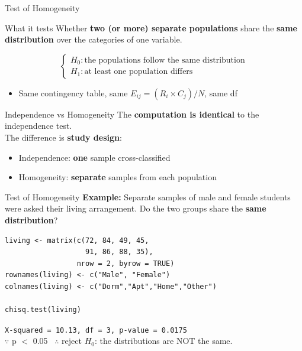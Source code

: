 \documentclass{beamer}					%
\begin{document}
\begin{frame}{Test of Homogeneity}
\small
\begin{block}{What it tests}
Whether \textbf{two (or more) separate populations} share the
\textbf{same distribution} over the categories of one variable.
\end{block}

\vspace{0.5em}
$$
\begin{cases}
H_0: \text{the populations follow the same distribution} \\
H_1: \text{at least one population differs}
\end{cases}
$$

\begin{itemize}
    \item Same contingency table, same $E_{ij} = (R_i \times C_j)/N$, same df
\end{itemize}

\vspace{0.8em}
\begin{alertblock}{Independence vs Homogeneity}
The \textbf{computation is identical} to the independence test.\\
The difference is \textbf{study design}: 
\begin{itemize}
    \item Independence: \textbf{one} sample cross-classified
    \item Homogeneity: \textbf{separate} samples from each population
\end{itemize}
\end{alertblock}

\end{frame}


\begin{frame}[fragile]{Test of Homogeneity}
\small
\textbf{Example:} Separate samples of male and female students were asked
their living arrangement. Do the two groups share the \textbf{same distribution}?

\begin{lstlisting}
living <- matrix(c(72, 84, 49, 45,
                   91, 86, 88, 35),
                 nrow = 2, byrow = TRUE)
rownames(living) <- c("Male", "Female")
colnames(living) <- c("Dorm","Apt","Home","Other")

chisq.test(living)
\end{lstlisting}

\vspace{0.3em}
\texttt{X-squared = 10.13, df = 3, p-value = 0.0175}\\

\vspace{0.3em}
$\because$ p $<$ 0.05 \ $\therefore$ reject $H_0$: the distributions are NOT the same.

\end{frame}
\end{document}
